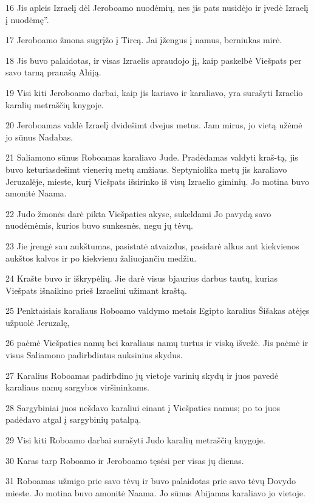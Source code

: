 \par 16 Jis apleis Izraelį dėl Jeroboamo nuodėmių, nes jis pats nusidėjo ir įvedė Izraelį į nuodėmę”. 
\par 17 Jeroboamo žmona sugrįžo į Tircą. Jai įžengus į namus, berniukas mirė. 
\par 18 Jis buvo palaidotas, ir visas Izraelis apraudojo jį, kaip paskelbė Viešpats per savo tarną pranašą Ahiją. 
\par 19 Visi kiti Jeroboamo darbai, kaip jis kariavo ir karaliavo, yra surašyti Izraelio karalių metraščių knygoje. 
\par 20 Jeroboamas valdė Izraelį dvidešimt dvejus metus. Jam mirus, jo vietą užėmė jo sūnus Nadabas. 
\par 21 Saliamono sūnus Roboamas karaliavo Jude. Pradėdamas valdyti kraš-tą, jis buvo keturiasdešimt vienerių metų amžiaus. Septyniolika metų jis karaliavo Jeruzalėje, mieste, kurį Viešpats išsirinko iš visų Izraelio giminių. Jo motina buvo amonitė Naama. 
\par 22 Judo žmonės darė pikta Viešpaties akyse, sukeldami Jo pavydą savo nuodėmėmis, kurios buvo sunkesnės, negu jų tėvų. 
\par 23 Jie įrengė sau aukštumas, pasistatė atvaizdus, pasidarė alkus ant kiekvienos aukštos kalvos ir po kiekvienu žaliuojančiu medžiu. 
\par 24 Krašte buvo ir iškrypėlių. Jie darė visus bjaurius darbus tautų, kurias Viešpats išnaikino prieš Izraeliui užimant kraštą. 
\par 25 Penktaisiais karaliaus Roboamo valdymo metais Egipto karalius Šišakas atėjęs užpuolė Jeruzalę, 
\par 26 paėmė Viešpaties namų bei karaliaus namų turtus ir viską išvežė. Jis paėmė ir visus Saliamono padirbdintus auksinius skydus. 
\par 27 Karalius Roboamas padirbdino jų vietoje varinių skydų ir juos pavedė karaliaus namų sargybos viršininkams. 
\par 28 Sargybiniai juos nešdavo karaliui einant į Viešpaties namus; po to juos padėdavo atgal į sargybinių patalpą. 
\par 29 Visi kiti Roboamo darbai surašyti Judo karalių metraščių knygoje. 
\par 30 Karas tarp Roboamo ir Jeroboamo tęsėsi per visas jų dienas. 
\par 31 Roboamas užmigo prie savo tėvų ir buvo palaidotas prie savo tėvų Dovydo mieste. Jo motina buvo amonitė Naama. Jo sūnus Abijamas karaliavo jo vietoje.



